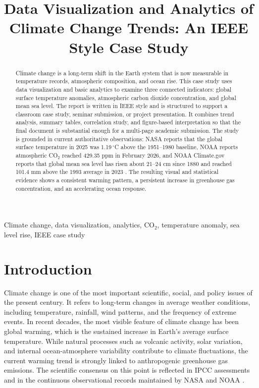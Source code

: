 \documentclass[conference]{IEEEtran}
\title{Data Visualization and Analytics of Climate Change Trends: An IEEE Style Case Study}
\author{
\IEEEauthorblockN{Nikshay Yadav}
\IEEEauthorblockA{
Department of Computer Science and Engineering\\
SGT University, Gurugram, India\\
relativity19056@gmail.com
}
}
\begin{document}
\maketitle

\begin{abstract}
Climate change is a long-term shift in the Earth system that is now measurable in temperature records, atmospheric composition, and ocean rise. This case study uses data visualization and basic analytics to examine three connected indicators: global surface temperature anomalies, atmospheric carbon dioxide concentration, and global mean sea level. The report is written in IEEE style and is structured to support a classroom case study, seminar submission, or project presentation. It combines trend analysis, summary tables, correlation study, and figure-based interpretation so that the final document is substantial enough for a multi-page academic submission. The study is grounded in current authoritative observations: NASA reports that the global surface temperature in 2025 was 1.19\,$^\circ$C above the 1951--1980 baseline, NOAA reports atmospheric CO$_2$ reached 429.35 ppm in February 2026, and NOAA Climate.gov reports that global mean sea level has risen about 21--24 cm since 1880 and reached 101.4 mm above the 1993 average in 2023 \cite{nasa_temp,noaa_co2,noaa_sea}. The resulting visual and statistical evidence shows a consistent warming pattern, a persistent increase in greenhouse gas concentration, and an accelerating ocean response. 
\end{abstract}

\begin{IEEEkeywords}
Climate change, data visualization, analytics, CO$_2$, temperature anomaly, sea level rise, IEEE case study
\end{IEEEkeywords}

\section{Introduction}
Climate change is one of the most important scientific, social, and policy issues of the present century. It refers to long-term changes in average weather conditions, including temperature, rainfall, wind patterns, and the frequency of extreme events. In recent decades, the most visible feature of climate change has been global warming, which is the sustained increase in Earth’s average surface temperature. While natural processes such as volcanic activity, solar variation, and internal ocean-atmosphere variability contribute to climate fluctuations, the current warming trend is strongly linked to anthropogenic greenhouse gas emissions. The scientific consensus on this point is reflected in IPCC assessments and in the continuous observational records maintained by NASA and NOAA \cite{ipcc_ar6,nasa_temp,noaa_state2023}.
\end{document}
